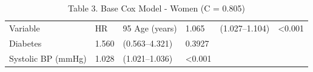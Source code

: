 \begin{table}[ht]
\centering
\caption{Table 3. Base Cox Model - Women (C = 0.805)} 
\begin{tabular}{llll}
  \toprule
Variable & HR & 95%
  \midrule
Age (years) & 1.065 & (1.027–1.104) & <0.001 \\ 
  Diabetes & 1.560 & (0.563–4.321) & 0.3927 \\ 
  Systolic BP (mmHg) & 1.028 & (1.021–1.036) & <0.001 \\ 
   \bottomrule
\end{tabular}
\end{table}
